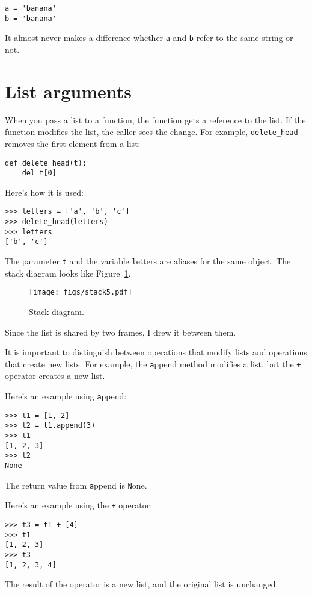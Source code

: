 \documentclass[
DIV=11,
fontsize=12,
twoside,
headinclude=false,
titlepage=firstiscover,
abstract=true,
headsepline=true,
footsepline=true,
chapterprefix=true, %
headings=big,
bibliography=totoc,%
captions=tableheading
]{scrbook}
\theoremstyle{definition}
\begin{document}
\begin{lstlisting}
a = 'banana'
b = 'banana'
\end{lstlisting}
%
It almost never makes a difference whether {\texttt a} and {\texttt b} refer
to the same string or not.


\section{List arguments}
\label{list.arguments}

When you pass a list to a function, the function gets a reference to
the list.  If the function modifies the list, the caller sees
the change.  For example, \verb"delete_head" removes the first element
from a list:

\begin{lstlisting}
def delete_head(t):
    del t[0]
\end{lstlisting}
%
Here's how it is used:

\begin{lstlisting}
>>> letters = ['a', 'b', 'c']
>>> delete_head(letters)
>>> letters
['b', 'c']
\end{lstlisting}
%
The parameter {\texttt t} and the variable {\texttt letters} are
aliases for the same object.  The stack diagram looks like
Figure~\ref{fig.stack5}.

\begin{figure}
\centerline
{\texttt{[image: figs/stack5.pdf]}}
\caption{Stack diagram.}
\label{fig.stack5}
\end{figure}

Since the list is shared by two frames, I drew
it between them.

It is important to distinguish between operations that
modify lists and operations that create new lists.  For
example, the {\texttt append} method modifies a list, but the
{\texttt +} operator creates a new list.

Here's an example using {\texttt append}:
%
\begin{lstlisting}
>>> t1 = [1, 2]
>>> t2 = t1.append(3)
>>> t1
[1, 2, 3]
>>> t2
None
\end{lstlisting}
%
The return value from {\texttt append} is {\texttt None}.

Here's an example using the {\texttt +} operator:
%
\begin{lstlisting}
>>> t3 = t1 + [4]
>>> t1
[1, 2, 3]
>>> t3
[1, 2, 3, 4]
\end{lstlisting}
%
The result of the operator is a new list, and the original list is
unchanged.
\end{document}
